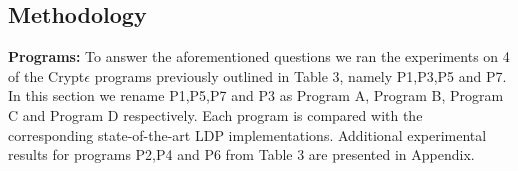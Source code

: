 \subsection{Methodology} 
\textbf{Programs:}
To answer the aforementioned questions we ran the experiments on 4 of the Crypt$\epsilon$ programs previously outlined in Table 3, namely P1,P3,P5 and P7. In this section we rename P1,P5,P7 and P3 as Program A, Program B, Program C and Program D respectively.  Each program is compared with the corresponding state-of-the-art \textsf{LDP} implementations. Additional experimental results for programs P2,P4 and P6 from Table 3 are presented in Appendix.%
